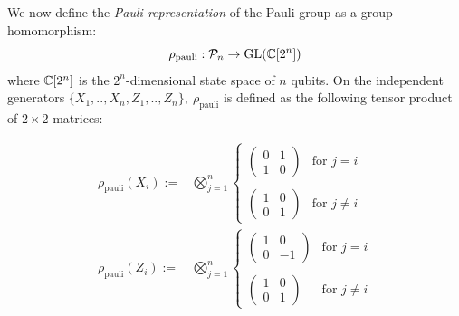 \documentclass[12pt]{article}
\begin{document}
We now define the
{\it Pauli representation} 
of the Pauli group as a group homomorphism:
$$
    \rho_{\mathrm{pauli}} : \mathcal{P}_n \to \mathrm{GL}(\mathbb{C}[2^n])
$$
where $\mathbb{C}[2^n]$ is the $2^n$-dimensional state space of $n$ qubits.
On the independent generators 
$\{X_1, .., X_n, Z_1, .., Z_n\},\ \rho_{\mathrm{pauli}}$
is defined as the following tensor product of $2\times 2$ matrices:


\begin{align*}
\rho_{\mathrm{pauli}}(X_i) := &\bigotimes_{j=1}^n \left\{ \begin{array}{ll}
\left( \begin{array}{ll}
0&1\\
1&0\end{array} \right) &\mbox{for $j=i$}\\
\\
\left( \begin{array}{ll}
1&0\\
0&1\end{array} \right) &\mbox{for $j\ne i$} \end{array}
\right.\\
\rho_{\mathrm{pauli}}(Z_i) := &\bigotimes_{j=1}^n \left\{ \begin{array}{ll}
\left( \begin{array}{ll}
1&0\\
0&-1\end{array} \right) &\mbox{for $j=i$}\\
\\
\left( \begin{array}{rr}
1&0\\
0&1\end{array} \right) &\mbox{for $j\ne i$}\end{array}
\right.
\end{align*}
\end{document}
